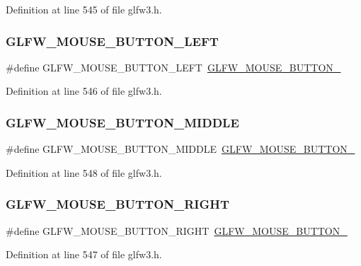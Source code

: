 Definition at line 545 of file glfw3.\+h.

\mbox{\label{group__buttons_gaf37100431dcd5082d48f95ee8bc8cd56}} 
\subsubsection{\texorpdfstring{GLFW\_MOUSE\_BUTTON\_LEFT}{GLFW\_MOUSE\_BUTTON\_LEFT}}
{\footnotesize\ttfamily \#define G\+L\+F\+W\+\_\+\+M\+O\+U\+S\+E\+\_\+\+B\+U\+T\+T\+O\+N\+\_\+\+L\+E\+FT~\mbox{\hyperlink{group__buttons_ga181a6e875251fd8671654eff00f9112e}{G\+L\+F\+W\+\_\+\+M\+O\+U\+S\+E\+\_\+\+B\+U\+T\+T\+O\+N\+\_}}}



Definition at line 546 of file glfw3.\+h.

\mbox{\label{group__buttons_ga34a4d2a701434f763fd93a2ff842b95a}} 
\subsubsection{\texorpdfstring{GLFW\_MOUSE\_BUTTON\_MIDDLE}{GLFW\_MOUSE\_BUTTON\_MIDDLE}}
{\footnotesize\ttfamily \#define G\+L\+F\+W\+\_\+\+M\+O\+U\+S\+E\+\_\+\+B\+U\+T\+T\+O\+N\+\_\+\+M\+I\+D\+D\+LE~\mbox{\hyperlink{group__buttons_ga0130d505563d0236a6f85545f19e1721}{G\+L\+F\+W\+\_\+\+M\+O\+U\+S\+E\+\_\+\+B\+U\+T\+T\+O\+N\+\_}}}



Definition at line 548 of file glfw3.\+h.

\mbox{\label{group__buttons_ga3e2f2cf3c4942df73cc094247d275e74}} 
\subsubsection{\texorpdfstring{GLFW\_MOUSE\_BUTTON\_RIGHT}{GLFW\_MOUSE\_BUTTON\_RIGHT}}
{\footnotesize\ttfamily \#define G\+L\+F\+W\+\_\+\+M\+O\+U\+S\+E\+\_\+\+B\+U\+T\+T\+O\+N\+\_\+\+R\+I\+G\+HT~\mbox{\hyperlink{group__buttons_ga604b39b92c88ce9bd332e97fc3f4156c}{G\+L\+F\+W\+\_\+\+M\+O\+U\+S\+E\+\_\+\+B\+U\+T\+T\+O\+N\+\_}}}



Definition at line 547 of file glfw3.\+h.

